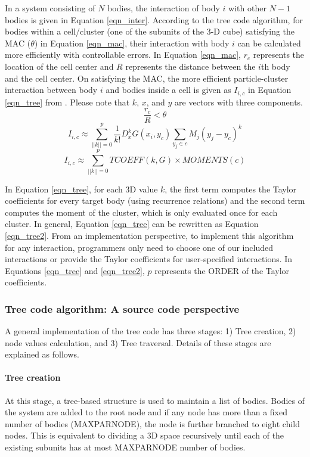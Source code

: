 \documentclass[draftclsnofoot]{elsarticle}
\begin{document}
In a system consisting of $N$ bodies, 
the interaction of  body $i$ with other $N-1$ bodies is given in Equation \ref{eqn_inter}.  
According to the tree code algorithm, 
for bodies within a cell/cluster (one of the subunits of the 3-D cube) 
satisfying the MAC ($\theta$) \cite{mac}  in Equation \ref{eqn_mac},  
their interaction with body $i$ can be calculated more efficiently with controllable errors. 
In Equation \ref{eqn_mac}, $r_c$ represents the location of the cell center and $R$ represents the distance between the $i$th body
and the cell center. On satisfying the MAC, the more efficient particle-cluster interaction between body $i$ and bodies inside a cell is given  as 
$I_{i,c}$ in Equation \ref{eqn_tree} from \cite{krasny1,li,vortex}.  Please note that $k$, $x$, and $y$ are vectors with three components. 
\begin{equation}
\label{eqn_mac}
\frac{r_c}{R}<\theta 
\end{equation}
\begin{equation}
\label{eqn_tree}
I_{i,c} \approx \sum\limits_{||k||=0}^{p} \frac{1}{k!}D^{k}_{x}G(x_i,y_c) \sum\limits_{y_j \in c}M_j{(y_j-y_c)}^k
\end{equation}
\begin{equation}
\label{eqn_tree2}
I_{i,c} \approx \sum\limits_{||k||=0}^{p} TCOEFF(k,G)\times MOMENTS(c) 
\end{equation}

In Equation \ref{eqn_tree}, for each 3D value $k$, the first term computes  the Taylor coefficients for every target body (using recurrence relations) 
and the second term computes the moment of the cluster, which is only evaluated once for each cluster. In general, Equation \ref{eqn_tree} can be rewritten as 
 Equation \ref{eqn_tree2}. From an implementation perspective, to 
implement this algorithm for any interaction, programmers only need to choose one of our included interactions or provide the Taylor coefficients for user-specified interactions.
In Equations \ref{eqn_tree} and \ref{eqn_tree2}, $p$ represents the ORDER of the Taylor coefficients. 


\subsubsection{Tree code algorithm: A source code perspective}
A general implementation of the tree code has three stages: 1) Tree creation, 2) node values calculation, and 3) Tree traversal. Details of these stages are explained as follows.
\paragraph{ Tree creation} At this stage, a tree-based structure is used to maintain a list of bodies.  Bodies of the system are added to the root node  and if any node
has more than a fixed number of  bodies (MAXPARNODE), the node is further branched to eight child nodes. This is equivalent to dividing a 3D space recursively until each of the existing subunits has at most MAXPARNODE number of bodies. 
\end{document}
